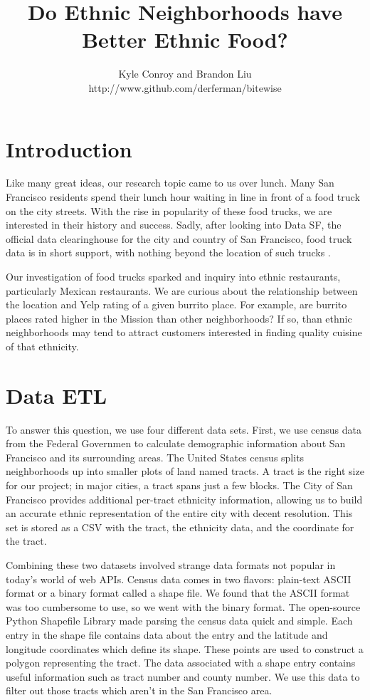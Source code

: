 \documentclass[11pt,twocolumn]{article}
\author{Kyle Conroy and Brandon Liu\\
http://www.github.com/derferman/bitewise}
\title{Do Ethnic Neighborhoods have Better Ethnic Food?}
\begin{document}
\maketitle

\section{Introduction}

Like many great ideas, our research topic came to us over lunch. Many San Francisco residents spend their lunch hour waiting in line in front of a food truck on the city streets. With the rise in popularity of these food trucks, we are interested in their history and success. Sadly, after looking into Data SF, the official data clearinghouse for the city and country of San Francisco, food truck data is in short support, with nothing beyond the location of such trucks \cite{foodtrucks}.

Our investigation of food trucks sparked and inquiry into ethnic restaurants, particularly Mexican restaurants. We are curious about the relationship between the location and Yelp rating of a given burrito place. For example, are burrito places rated higher in the Mission than other neighborhoods? If so, than ethnic neighborhoods may tend to attract customers interested in finding quality cuisine of that ethnicity.

\section{Data ETL}

To answer this question, we use four different data sets. First, we use census data from the Federal Governmen \cite{census} to calculate demographic information about San Francisco and its surrounding areas. The United States census splits neighborhoods up into smaller plots of land named tracts. A tract is the right size for our project; in major cities, a tract spans just a few blocks. The City of San Francisco provides additional per-tract ethnicity information\cite{bcensus}, allowing us to build an accurate ethnic representation of the entire city with decent resolution. This set is stored as a CSV with the tract, the ethnicity data, and the coordinate for the tract.

Combining these two datasets involved strange data formats not popular in today's world of web APIs. Census data comes in two flavors: plain-text ASCII format or a binary format called a shape file. We found that the ASCII format was too cumbersome to use, so we went with the binary format. The open-source Python Shapefile Library \cite{shapely} made parsing the census data quick and simple. Each entry in the shape file contains data about the entry and the latitude and longitude coordinates which define its shape. These points are used to construct a polygon representing the tract. The data associated with a shape entry contains useful information such as tract number and county number. We use this data to filter out those tracts which aren't in the San Francisco area.
\end{document}

